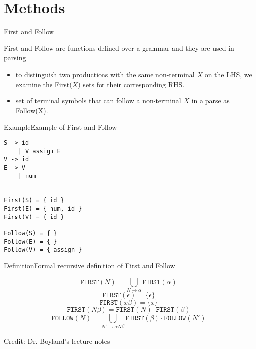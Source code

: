 \section{Methods}

\begin{frame}[fragile=singleslide]{First and Follow}{}

\alert{First} and \alert{Follow} are functions defined over a grammar and they are used in \alert{parsing}

\begin{itemize}
    \item to distinguish two productions with the same non-terminal $X$ on the LHS, we examine the First($X$) sets for their corresponding RHS.
    \item set of terminal symbols that can follow a non-terminal $X$ in a parse as Follow(X).
\end{itemize}

\end{frame}


\begin{frame}[fragile=singleslide]{Example}{Example of First and Follow}

\begin{multicols}{2}
\begin{Verbatim}[fontsize=\small]
S -> id
    | V assign E
V -> id
E -> V
    | num


First(S) = { id }
First(E) = { num, id }
First(V) = { id }

Follow(S) = { }
Follow(E) = { }
Follow(V) = { assign }
\end{Verbatim}
\end{multicols}

\end{frame}


\begin{frame}{Definition}{Formal recursive definition of First and Follow}

\[ \texttt{FIRST}(N) = \bigcup_{N \to \alpha} \texttt{FIRST}(\alpha) \]
\[ \texttt{FIRST}(\epsilon)   = \{ \epsilon \} \]
\[ \texttt{FIRST}(x \beta)   =\{x\} \]
\[ \texttt{FIRST}(N \beta)   =   \texttt{FIRST}(N) \cdot \texttt{FIRST}(\beta)  \]
\[ \texttt{FOLLOW}(N) = \bigcup_{N' \to \alpha N \beta} \texttt{FIRST}(\beta) \cdot \texttt{FOLLOW}(N') \]

\newlinevspace

Credit: Dr. Boyland's lecture notes
\end{frame}

